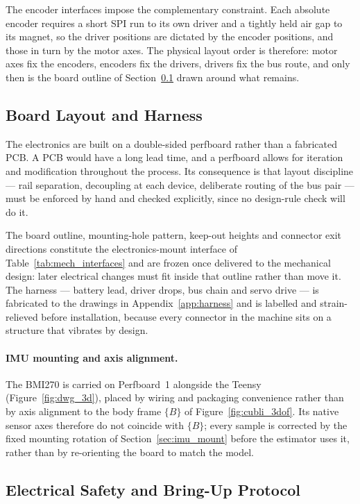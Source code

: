 The encoder interfaces impose the complementary constraint. Each absolute
encoder requires a short SPI run to its own driver and a tightly held air gap to
its magnet, so the driver positions are dictated by the encoder positions, and
those in turn by the motor axes. The physical layout order is therefore: motor
axes fix the encoders, encoders fix the drivers, drivers fix the bus route, and
only then is the board outline of Section~\ref{sec:layout} drawn around what
remains.

\subsection{Board Layout and Harness}
\label{sec:layout}

The electronics are built on a double-sided perfboard rather than a fabricated PCB. A PCB would have a long lead time, and a perfboard allows for iteration and modification throughout the process. Its consequence is that
layout discipline --- rail separation, decoupling at each device, deliberate
routing of the bus pair --- must be enforced by hand and checked explicitly,
since no design-rule check will do it.

The board outline, mounting-hole pattern, keep-out heights and connector exit
directions constitute the electronics-mount interface of
Table~\ref{tab:mech_interfaces} and are frozen once delivered to the mechanical
design: later electrical changes must fit inside that outline rather than move
it. The harness --- battery lead, driver drops, bus chain and servo drive ---
is fabricated to the drawings in Appendix~\ref{app:harness} and is labelled and
strain-relieved before installation, because every connector in the machine sits
on a structure that vibrates by design.

\paragraph{IMU mounting and axis alignment.} The BMI270 is carried on
Perfboard~1 alongside the Teensy (Figure~\ref{fig:dwg_3d}), placed by wiring
and packaging convenience rather than by axis alignment to the body frame
$\{B\}$ of Figure~\ref{fig:cubli_3dof}. Its native sensor axes therefore do not
coincide with $\{B\}$; every sample is corrected by the fixed mounting
rotation of Section~\ref{sec:imu_mount} before the estimator uses it, rather
than by re-orienting the board to match the model.

\subsection{Electrical Safety and Bring-Up Protocol}
\label{sec:electrical_safety}

